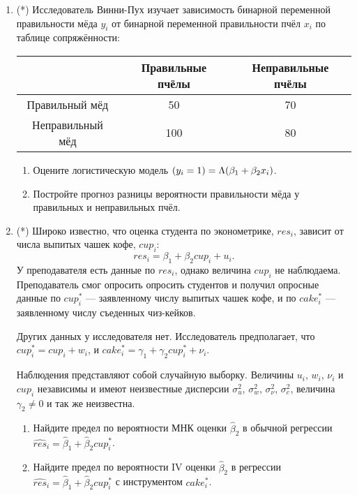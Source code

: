 \documentclass[12pt]{article}
\let\P\relax
\DeclareMathOperator{\P}{\mathbb{P}}
\begin{document}
\begin{enumerate}
    
\newpage
    \item (*) Исследователь Винни-Пух изучает зависимость бинарной переменной правильности мёда $y_i$ 
    от бинарной переменной правильности пчёл $x_i$ по таблице сопряжённости:

    \begin{tabular}{ccc}
        \toprule 
         & Правильные пчёлы & Неправильные пчёлы \\
        \midrule
        Правильный мёд & 50 & 70 \\
        Неправильный мёд & 100 & 80 \\
        \bottomrule
    \end{tabular}
    
    \begin{enumerate}
        \item Оцените логистическую модель $\P(y_i = 1) = \Lambda(\beta_1 + \beta_2 x_i)$. 
        \item Постройте прогноз разницы вероятности правильности мёда у правильных и неправильных пчёл. 
    \end{enumerate}

\item (*) Широко известно, что оценка студента по эконометрике, $res_i$, зависит от числа выпитых чашек кофе, $cup_i$:
\[
res_i = \beta_1 + \beta_2 cup_i + u_i.
\]
У преподавателя есть данные по $res_i$, однако величина $cup_i$ не наблюдаема. 
Преподаватель смог опросить опросить студентов и получил опросные данные по $cup_i^*$ —
заявленному числу выпитых чашек кофе, и по $cake_i^*$ — заявленному числу съеденных чиз-кейков. 

Других данных у исследователя нет. Исследователь предполагает, что $cup_i^* = cup_i + w_i$, и
$cake_i^* = \gamma_1 + \gamma_2 cup^*_i + \nu_i$. 


Наблюдения представляют собой случайную выборку. 
Величины $u_i$, $w_i$, $\nu_i$ и $cup_i$ независимы и имеют неизвестные дисперсии $\sigma^2_u$, $\sigma^2_w$,
$\sigma^2_{\nu}$, $\sigma^2_c$, величина $\gamma_2 \neq 0$ и так же неизвестна. 



\begin{enumerate}
    \item Найдите предел по вероятности МНК оценки $\hat\beta_2$ 
    в обычной регрессии $\widehat{res}_i = \hat\beta_1 + \hat\beta_2 cup_i^*$. 

    \item Найдите предел по вероятности IV оценки $\hat\beta_2$ 
    в регрессии $\widehat{res}_i = \hat\beta_1 + \hat\beta_2 cup_i^*$ с инструментом $cake_i^*$.
\end{enumerate}


\end{enumerate}
\end{document}
